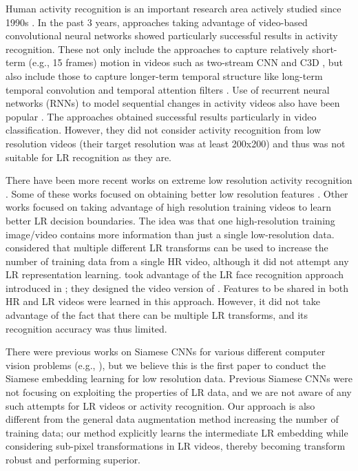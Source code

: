 \documentclass[letterpaper]{article} %
\begin{document}
Human activity recognition is an important research area actively studied since 1990s \cite{ryoo-review}. In the past 3 years, approaches taking advantage of video-based convolutional neural networks showed particularly successful results in activity recognition. These not only include the approaches to capture relatively short-term (e.g., 15 frames) motion in videos such as two-stream CNN \cite{simonyan14} and C3D \cite{c3d}, but also include those to capture longer-term temporal structure like long-term temporal convolution \cite{varol16} and temporal attention filters \cite{piergiovanni2016learning}. Use of recurrent neural networks (RNNs) to model sequential changes in activity videos also have been popular \cite{google15,yeong16}. The approaches obtained successful results particularly in video classification. However, they did not consider activity recognition from low resolution videos (their target resolution was at least 200x200) and thus was not suitable for LR recognition as they are.

There have been more recent works on extreme low resolution activity recognition \cite{dai15,ryoo17privacy,chen17,cheng17emotion}. Some of these works focused on obtaining better low resolution features \cite{dai15}. Other works focused on taking advantage of high resolution training videos to learn better LR decision boundaries. The idea was that one high-resolution training image/video contains more information than just a single low-resolution data.
\cite{ryoo17privacy} considered that multiple different LR transforms can be used to increase the number of training data from a single HR video, although it did not attempt any LR representation learning. \cite{chen17} took advantage of the LR face recognition approach introduced in \cite{lrface16}; they designed the video version of \cite{lrface16}. Features to be shared in both HR and LR videos were learned in this approach. However, it did not take advantage of the fact that there can be multiple LR transforms, and its recognition accuracy was thus limited.


There were previous works on Siamese CNNs for various different computer vision problems (e.g., \cite{hadsell2006dimensionality,bell15siggraph,wang2015unsupervised}), but we believe this is the first paper to conduct the Siamese embedding learning for low resolution data. Previous Siamese CNNs were not focusing on exploiting the properties of LR data, and we are not aware of any such  attempts for LR videos or activity recognition. Our approach is also different from the general data augmentation method increasing the number of training data; our method explicitly learns the intermediate LR embedding while considering sub-pixel transformations in LR videos, thereby becoming transform robust and performing superior.
\end{document}
